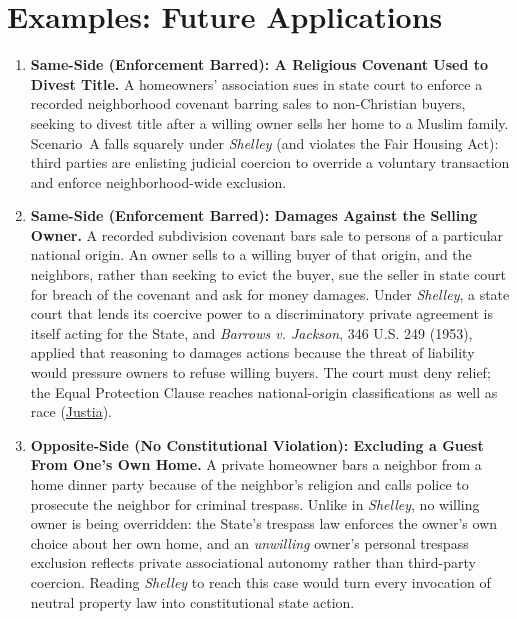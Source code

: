 \documentclass[12pt]{article}
\begin{document}
\section{Examples: Future Applications}
\begin{enumerate}

\item \textbf{Same-Side (Enforcement Barred): A Religious Covenant Used to Divest Title.} A homeowners' association sues in state court to enforce a recorded neighborhood covenant barring sales to non-Christian buyers, seeking to divest title after a willing owner sells her home to a Muslim family. Scenario~A falls squarely under \textit{Shelley} (and violates the Fair Housing Act): third parties are enlisting judicial coercion to override a voluntary transaction and enforce neighborhood-wide exclusion.

\item \textbf{Same-Side (Enforcement Barred): Damages Against the Selling Owner.} A recorded subdivision covenant bars sale to persons of a particular national origin. An owner sells to a willing buyer of that origin, and the neighbors, rather than seeking to evict the buyer, sue the seller in state court for breach of the covenant and ask for money damages. Under \textit{Shelley}, a state court that lends its coercive power to a discriminatory private agreement is itself acting for the State, and \textit{Barrows v. Jackson}, 346 U.S. 249 (1953), applied that reasoning to damages actions because the threat of liability would pressure owners to refuse willing buyers. The court must deny relief; the Equal Protection Clause reaches national-origin classifications as well as race (\href{https://supreme.justia.com/cases/federal/us/334/1/}{Justia}).

\item \textbf{Opposite-Side (No Constitutional Violation): Excluding a Guest From One's Own Home.} A private homeowner bars a neighbor from a home dinner party because of the neighbor's religion and calls police to prosecute the neighbor for criminal trespass. Unlike in \textit{Shelley}, no willing owner is being overridden: the State's trespass law enforces the owner's own choice about her own home, and an \textit{unwilling} owner's personal trespass exclusion reflects private associational autonomy rather than third-party coercion. Reading \textit{Shelley} to reach this case would turn every invocation of neutral property law into constitutional state action.


\end{enumerate}
\end{document}
